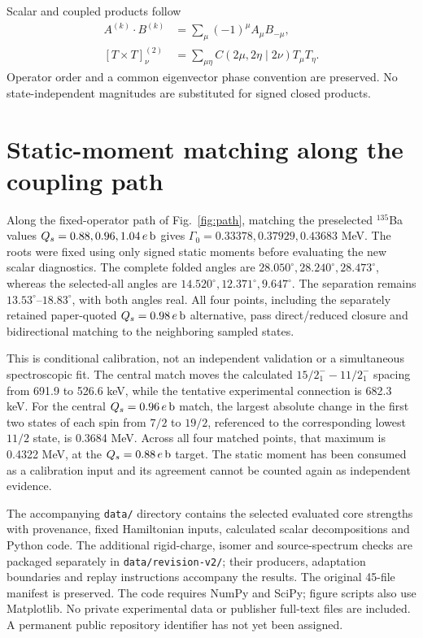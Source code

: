 \documentclass[pdflatex,iicol,sn-mathphys-num]{sn-jnl}
\begin{document}
Scalar and coupled products follow
\begin{align}
A^{(k)}\cdot B^{(k)}&=\sum_\mu(-1)^\mu A_\mu B_{-\mu},\\
[T\times T]^{(2)}_\nu&=\sum_{\mu\eta}
C(2\mu,2\eta\mid2\nu)T_\mu T_\eta .
\end{align}
Operator order and a common eigenvector phase convention are preserved.
No state-independent magnitudes are substituted for signed closed products.

\section{Static-moment matching along the coupling path}\label{app:momentmatch}

Along the fixed-operator path of Fig.~\ref{fig:path}, matching the preselected
$^{135}$Ba values $Q_s=0.88,0.96,1.04\,e\,{\rm b}$ gives
$\Gamma_0=0.33378,0.37929,0.43683$ MeV.
The roots were fixed using only signed static moments before evaluating
the new scalar diagnostics. The complete folded angles are
$28.050^\circ,28.240^\circ,28.473^\circ$, whereas the selected-all angles
are $14.520^\circ,12.371^\circ,9.647^\circ$.
The separation remains $13.53^\circ$--$18.83^\circ$, with both angles real.
All four points, including the separately retained paper-quoted
$Q_s=0.98\,e\,{\rm b}$ alternative, pass direct/reduced closure and
bidirectional matching to the neighboring sampled states.

This is conditional calibration, not an independent validation or a
simultaneous spectroscopic fit. The central match moves the calculated
$15/2_1^--11/2_1^-$ spacing from 691.9 to 526.6 keV, while the tentative
experimental connection is 682.3 keV. For the central $Q_s=0.96\,e\,{\rm b}$
match, the largest absolute change in the first two
states of each spin from $7/2$ to $19/2$, referenced to the corresponding
lowest $11/2$ state, is 0.3684 MeV.
Across all four matched points, that maximum is 0.4322 MeV, at the
$Q_s=0.88\,e\,{\rm b}$ target.
The static moment has been consumed as a calibration input and its
agreement cannot be counted again as independent evidence.



\backmatter
{}
The accompanying \texttt{data/} directory contains the selected evaluated core strengths with provenance, fixed Hamiltonian inputs, calculated scalar decompositions and Python code. The additional rigid-charge, isomer and source-spectrum checks are packaged separately in \texttt{data/revision-v2/}; their producers, adaptation boundaries and replay instructions accompany the results. The original 45-file manifest is preserved. The code requires NumPy and SciPy; figure scripts also use Matplotlib. No private experimental data or publisher full-text files are included. A permanent public repository identifier has not yet been assigned.
\end{document}
